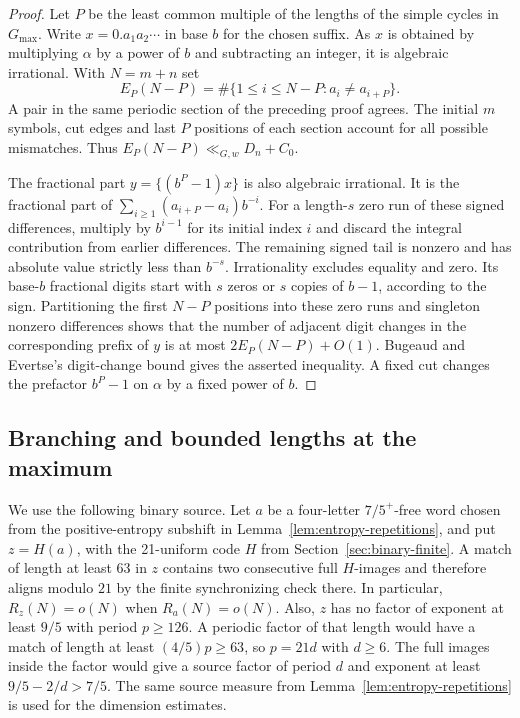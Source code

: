 \begin{proof}
Let \(P\) be the least common multiple of the lengths of the simple cycles in \(G_{\max}\). Write \(x=0.a_1a_2\cdots\) in base \(b\) for the chosen suffix. As \(x\) is obtained by multiplying \(\alpha\) by a power of \(b\) and subtracting an integer, it is algebraic irrational. With \(N=m+n\) set
\[
 E_P(N-P)=\#\{1\le i\le N-P:a_i\ne a_{i+P}\}.
\]
A pair in the same periodic section of the preceding proof agrees. The initial \(m\) symbols, cut edges and last \(P\) positions of each section account for all possible mismatches. Thus \(E_P(N-P)\ll_{G,w}D_n+C_0\).

The fractional part \(y=\{(b^P-1)x\}\) is also algebraic irrational. It is the fractional part of \(\sum_{i\ge1}(a_{i+P}-a_i)b^{-i}\). For a length-\(s\) zero run of these signed differences, multiply by \(b^{i-1}\) for its initial index \(i\) and discard the integral contribution from earlier differences. The remaining signed tail is nonzero and has absolute value strictly less than \(b^{-s}\). Irrationality excludes equality and zero. Its base-\(b\) fractional digits start with \(s\) zeros or \(s\) copies of \(b-1\), according to the sign. Partitioning the first \(N-P\) positions into these zero runs and singleton nonzero differences shows that the number of adjacent digit changes in the corresponding prefix of \(y\) is at most \(2E_P(N-P)+O(1)\). Bugeaud and Evertse's digit-change bound \cite[Theorem~3.1]{BE} gives the asserted inequality. A fixed cut changes the prefactor \(b^P-1\) on \(\alpha\) by a fixed power of \(b\).
\end{proof}

\subsection{Branching and bounded lengths at the maximum}

We use the following binary source. Let \(a\) be a four-letter \(7/5^+\)-free word chosen from the positive-entropy subshift in Lemma~\ref{lem:entropy-repetitions}, and put \(z=H(a)\), with the 21-uniform code \(H\) from Section~\ref{sec:binary-finite}. A match of length at least \(63\) in \(z\) contains two consecutive full \(H\)-images and therefore aligns modulo \(21\) by the finite synchronizing check there. In particular, \(R_z(N)=o(N)\) when \(R_a(N)=o(N)\). Also, \(z\) has no factor of exponent at least \(9/5\) with period \(p\ge126\). A periodic factor of that length would have a match of length at least \((4/5)p\ge63\), so \(p=21d\) with \(d\ge6\). The full images inside the factor would give a source factor of period \(d\) and exponent at least \(9/5-2/d>7/5\). The same source measure from Lemma~\ref{lem:entropy-repetitions} is used for the dimension estimates.


